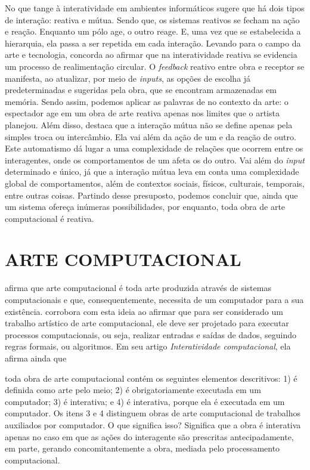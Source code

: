 No que tange à interatividade em ambientes informáticos  sugere que há dois tipos de interação: reativa e mútua. Sendo que,  os sistemas reativos se fecham na ação e reação. Enquanto um pólo age, o outro reage. E, uma vez que se estabelecida a hierarquia, ela passa a ser repetida em cada interação. Levando para o campo da arte e tecnologia,  concorda ao afirmar que na interatividade reativa se evidencia um processo de realimentação circular. O \textit{feedback} reativo entre obra e receptor se manifesta, ao atualizar, por meio de \textit{inputs}, as opções de escolha já predeterminadas e sugeridas pela obra, que se encontram armazenadas em memória. Sendo assim, podemos aplicar as palavras de  no contexto da arte: o espectador age em um obra de arte reativa apenas nos limites que o artista planejou. Além disso,  destaca que a interação mútua não se define apenas pela simples troca ou intercâmbio. Ela vai além da ação de um e da reação de outro. Este automatismo dá lugar a uma complexidade de relações que ocorrem entre os interagentes, onde os comportamentos de um afeta os do outro. Vai além do \textit{input} determinado e único, já que a interação mútua leva em conta uma complexidade global de comportamentos, além de contextos sociais, físicos, culturais, temporais, entre outras coisas. Partindo desse presuposto, podemos concluir que, ainda que um sistema ofereça inúmeras possibilidades, por enquanto, toda obra de arte computacional é reativa.


\section{ARTE COMPUTACIONAL}

 afirma que arte computacional é toda arte produzida através de sistemas  computacionais e que, consequentemente, necessita de um computador para a sua existência.  corrobora com esta ideia ao afirmar que para ser considerado um trabalho artístico de arte computacional, ele deve ser projetado para executar processos computacionais, ou seja, realizar entradas e saídas de dados, seguindo regras formais, ou algoritmos. Em seu artigo \textit{Interatividade computacional}, ela afirma ainda que

\begin{citacao}
toda obra de arte computacional contém os seguintes elementos descritivos: 1) é definida como arte pelo meio; 2) é obrigatoriamente executada em um computador; 3) é interativa; e 4) é interativa, porque ela é executada em um computador. Os itens 3 e 4 distinguem obras de arte computacional de trabalhos auxiliados por computador. O que significa isso? Significa que a obra é interativa apenas no caso em que as ações do interagente são prescritas antecipadamente, em parte, gerando concomitantemente a obra, mediada pelo processamento computacional.  \cite[p. 133]{venturelli}
\end{citacao}

